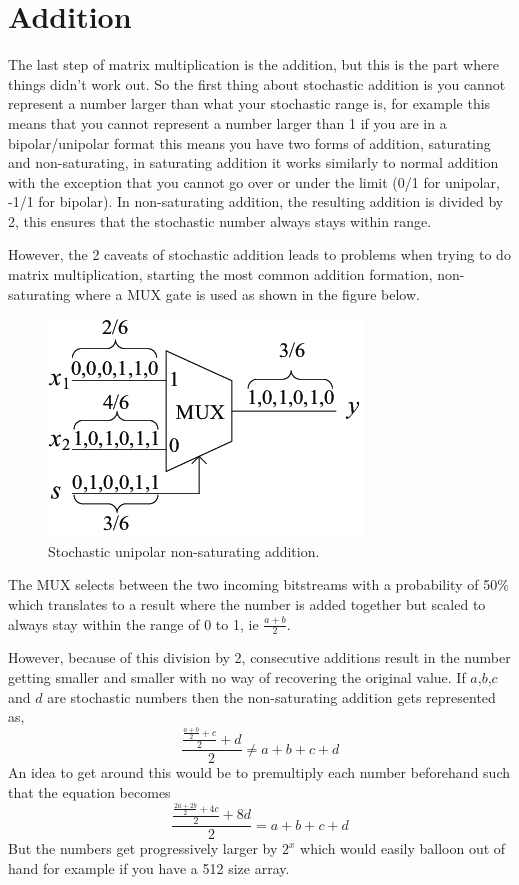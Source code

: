 \documentclass[a4paper,oneside,phd,etd]{BYUPhys}
\begin{document}
\section{Addition}
The last step of matrix multiplication is the addition, but this is the part where things didn't work out. So the first thing about stochastic addition is you cannot represent a number larger than what your stochastic range is, for example this means that you cannot represent a number larger than 1 if you are in a bipolar/unipolar format this means you have two forms of addition, saturating and non-saturating, in saturating addition it works similarly to normal addition with the exception that you cannot go over or under the limit (0/1 for unipolar, -1/1 for bipolar). In non-saturating addition, the resulting addition is divided by 2, this ensures that the stochastic number always stays within range.

However, the 2 caveats of stochastic addition leads to problems when trying to do matrix multiplication, starting the most common addition formation, non-saturating where a MUX gate is used as shown in the figure below.
\begin{figure}[H]
\centering
\includegraphics[scale=2]{pictures/add.png}
\caption{Stochastic unipolar non-saturating addition\cite{fig:multiplyslashadd}.}
\label{fig:multiplyslashadd}
\end{figure}
The MUX selects between the two incoming bitstreams with a probability of 50\% which translates to a result where the number is added together but scaled to always stay within the range of 0 to 1, ie $\frac{a+b}{2}$.

However, because of this division by 2, consecutive additions result in the number getting smaller and smaller with no way of recovering the original value.
If $a$,$b$,$c$ and $d$ are stochastic numbers then the non-saturating addition gets represented as,
$$\frac{\frac{\frac{a+b}{2}+c}{2}+d}{2} \neq a+b+c+d$$
An idea to get around this would be to premultiply each number beforehand such that the equation becomes
$$\frac{\frac{\frac{2a+2b}{2}+4c}{2}+8d}{2} = a+b+c+d$$
But the numbers get progressively larger by $2^x$ which would easily balloon out of hand for example if you have a 512 size array.
\end{document}
